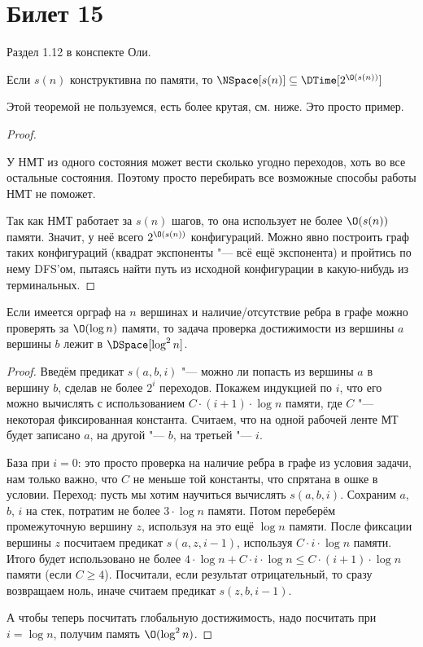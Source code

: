 \setcounter{section}{14}
\section{Билет 15}
	Раздел 1.12 в конспекте Оли.

	\begin{theorem}
		Если $s(n)$ конструктивна по памяти, то $\NSpace[s(n)] \subseteq \DTime[2^{\O(s(n))}]$
	\end{theorem}
	\begin{Rem}
		Этой теоремой не пользуемся, есть более крутая, см. ниже.
		Это просто пример.
	\end{Rem}
	\begin{proof}
		\begin{Rem}
			У НМТ из одного состояния может вести сколько угодно переходов, хоть во все остальные состояния.
			Поэтому просто перебирать все возможные способы работы НМТ не поможет.
		\end{Rem}
		Так как НМТ работает за $s(n)$ шагов, то она использует не более $\O(s(n))$ памяти.
		Значит, у неё всего $2^{\O(s(n))}$ конфигураций.
		Можно явно построить граф таких конфигураций (квадрат экспоненты "--- всё ещё экспонента) и пройтись по нему DFS'ом, пытаясь найти путь из исходной конфигурации в какую-нибудь из терминальных.
	\end{proof}

	\begin{theorem}
		Если имеется орграф на $n$ вершинах и наличие/отсутствие ребра в графе можно проверять за $\O(\log n)$ памяти,
		то задача проверка достижимости из вершины $a$ вершины $b$ лежит в $\DSpace[\log^2 n]$.
	\end{theorem}
	\begin{proof}
		Введём предикат $s(a, b, i)$ "--- можно ли попасть из вершины $a$ в вершину $b$, сделав не более $2^i$ переходов.
		Покажем индукцией по $i$, что его можно вычислять с использованием $C \cdot (i+1)\cdot \log n$ памяти, где $C$ "--- некоторая фиксированная константа.
		Считаем, что на одной рабочей ленте МТ будет записано $a$, на другой "--- $b$, на третьей "--- $i$.

		База при $i=0$: это просто проверка на наличие ребра в графе из условия задачи, нам только важно, что $C$ не меньше той константы, что спрятана в ошке в условии.
		Переход: пусть мы хотим научиться вычислять $s(a, b, i)$.
		Сохраним $a$, $b$, $i$ на стек, потратим не более $3 \cdot \log n$ памяти.
		Потом переберём промежуточную вершину $z$, используя на это ещё $\log n$ памяти.
		После фиксации вершины $z$ посчитаем предикат $s(a, z, i - 1)$, используя $C \cdot i \cdot \log n$ памяти.
		Итого будет использовано не более $4 \cdot \log n + C \cdot i \cdot \log n \le C \cdot (i + 1) \cdot \log n$ памяти (если $C \ge 4$).
		Посчитали, если результат отрицательный, то сразу возвращаем ноль, иначе считаем предикат $s(z, b, i - 1)$.
		
		А чтобы теперь посчитать глобальную достижимость, надо посчитать при $i=\log n$, получим память $\O(\log^2 n)$.
	\end{proof}

